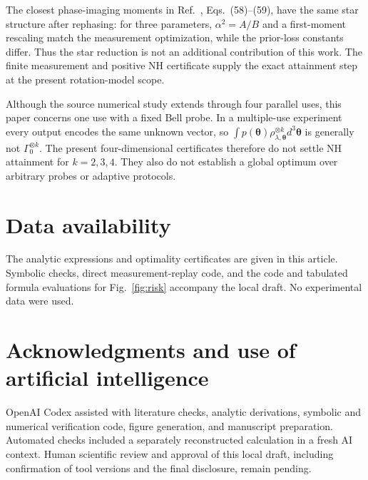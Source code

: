 \documentclass[aps,pra,reprint,amsmath,amssymb,nofootinbib,longbibliography,floatfix]{revtex4-2}
\newcommand{\thv}{\bm{\theta}}
\begin{document}
The closest phase-imaging moments in Ref.~\cite{Albarelli2026},
Eqs.~(58)--(59), have the same star structure after rephasing: for
three parameters, $\alpha^2=A/B$ and a first-moment rescaling match
the measurement optimization, while the prior-loss constants differ.
Thus the star reduction is not an additional contribution of this work.
The finite measurement and positive NH certificate supply the exact
attainment step at the present rotation-model scope.

Although the source numerical study extends through four parallel uses,
this paper concerns one use with a fixed Bell probe. In a multiple-use
experiment every output encodes the same unknown vector, so
$\int p(\thv)\rho_{\lambda,\thv}^{\otimes k}d^3\thv$ is generally
not $\Gamma_0^{\otimes k}$. The present four-dimensional certificates
therefore do not settle NH attainment for $k=2,3,4$. They also do not
establish a global optimum over arbitrary probes or adaptive protocols.

\section*{Data availability}
The analytic expressions and optimality certificates are given in this
article. Symbolic checks, direct measurement-replay code, and the code
and tabulated formula evaluations for Fig.~\ref{fig:risk} accompany
the local draft. No experimental data were used.

\section*{Acknowledgments and use of artificial intelligence}
OpenAI Codex assisted with literature checks, analytic derivations,
symbolic and numerical verification code, figure generation, and
manuscript preparation. Automated checks included a separately
reconstructed calculation in a fresh AI context. Human scientific
review and approval of this local draft, including confirmation of
tool versions and the final disclosure, remain pending.

\appendix
\end{document}
